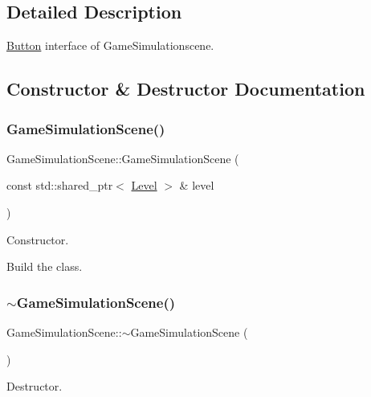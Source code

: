 \subsection{Detailed Description}
\hyperlink{classButton}{Button} interface of Game\+Simulationscene. 

\subsection{Constructor \& Destructor Documentation}
\mbox{\label{classGameSimulationScene_a6983b2c511d45278121bcf62151fbb19}} 
\subsubsection{\texorpdfstring{Game\+Simulation\+Scene()}{GameSimulationScene()}}
{\footnotesize\ttfamily Game\+Simulation\+Scene\+::\+Game\+Simulation\+Scene (\begin{DoxyParamCaption}\item[{const std\+::shared\+\_\+ptr$<$ \hyperlink{classLevel}{Level} $>$ \&}]{level }\end{DoxyParamCaption})}



Constructor. 

Build the class. \mbox{\label{classGameSimulationScene_af45f3e7f70376e59a6f320f21ce2897b}} 
\subsubsection{\texorpdfstring{$\sim$\+Game\+Simulation\+Scene()}{~GameSimulationScene()}}
{\footnotesize\ttfamily Game\+Simulation\+Scene\+::$\sim$\+Game\+Simulation\+Scene (\begin{DoxyParamCaption}{ }\end{DoxyParamCaption})}



Destructor. 

